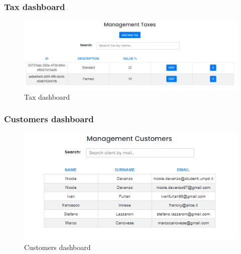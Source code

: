 \subsubsection{Tax dashboard} \label{_taxmanagement}
\begin{figure}[H]
    \centering
    \includegraphics[width=\linewidth]{res/images/venditore/taxmanagement.png}
    \caption{Tax dashboard}
\end{figure}
\subsubsection{Customers dashboard} \label{_customermanagement}
\begin{figure}[H]
    \centering
    \includegraphics[width=\linewidth]{res/images/venditore/customermanagement.png}
    \caption{Customers dashboard}
\end{figure}


